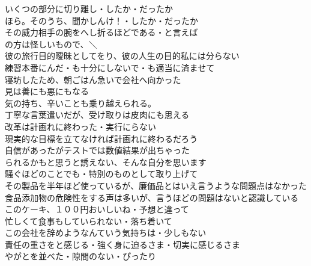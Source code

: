 いくつの部分に切り離し・したか・だったか\\
ほら。そのうち、聞かしんけ！・したか・だったか\\
その威力相手の腕をへし折るほどである・と言えば\\
の方は怪しいもので、＼\\
彼の旅行目的曖昧としてをり、彼の人生の目的私には分らない\\

練習本番にんだ・も十分にしないで・も適当に済ませて\\
寝坊したため、朝ごはん急いで会社へ向かった\\
見は善にも悪にもなる\\
気の持ち、辛いことも乗り越えられる。\\
丁寧な言葉遣いだが、受け取りは皮肉にも思える\\

改革は計画れに終わった・実行にらない\\
現実的な目標を立てなければ計画れに終わるだろう\\
自信があったがテストでは数値結果が出ちゃった\\
られるかもと思うと誘えない、そんな自分を思います\\

騒ぐほどのことでも・特別のものとして取り上げて\\
その製品を半年ほど使っているが、廉価品とはいえ言うような問題点はなかった\\
食品添加物の危険性をする声は多いが、言うほどの問題はないと認識している\\
このケーキ、１００円おいしいね・予想と違って\\

忙しくて食事もしていられない・落ち着いて\\
この会社を辞めようなんていう気持ちは・少しもない\\
責任の重さをと感じる・強く身に迫るさま・切実に感じるさま\\
やがとを並べた・隙間のない・ぴったり\\


